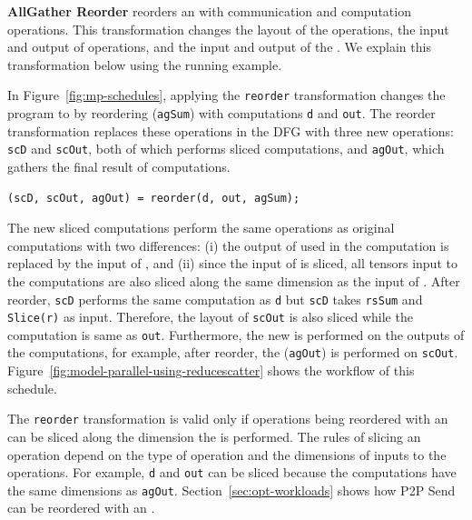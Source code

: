 \textbf{AllGather Reorder} reorders an \allgather with communication and computation operations. 
This transformation changes the layout of the operations, the input and output of operations, and the input and output of the \allgather.
We explain this transformation below using the running example.


In Figure~\ref{fig:mp-schedules}, applying the \texttt{reorder} transformation changes the program  to  by reordering \allgather (\texttt{agSum}) with computations \texttt{d} and \texttt{out}.
The reorder transformation replaces these operations in the DFG with three new operations: \texttt{scD} and \texttt{scOut},
both of which performs sliced computations, and \texttt{agOut}, which gathers the final result of computations.
{
  \small
\begin{lstlisting}[language=DSL,numbers=none]
(scD, scOut, agOut) = reorder(d, out, agSum);
\end{lstlisting}
}
The new sliced computations perform the same operations as original computations with two differences: (i) the output of \allgather used in the computation is replaced by the input of \allgather, and (ii) since the input of \allgather is sliced, 
all tensors input to the computations are also sliced along the same dimension as the input of \allgather.
After reorder, \texttt{scD} performs the same computation as \texttt{d} but \texttt{scD} takes \texttt{rsSum} and \texttt{Slice(r)} as input.
Therefore, the layout of \texttt{scOut} is also sliced while the computation is same as \texttt{out}.
Furthermore, the new \allgather is performed on the outputs of the computations, for example, 
after reorder, the \allgather (\texttt{agOut}) is performed on \texttt{scOut}.
Figure~\ref{fig:model-parallel-using-reducescatter} shows the workflow of this schedule.

 The \texttt{reorder} transformation is valid only if operations being reordered with an \allgather can be sliced along the dimension the \allgather is performed.
The rules of slicing an operation depend on the type of operation and the dimensions of inputs to the operations.
For example, \texttt{d} and \texttt{out} can be sliced because the computations have the same dimensions as \texttt{agOut}.
Section~\ref{sec:opt-workloads} shows how P2P Send can be reordered with an \allgather.

